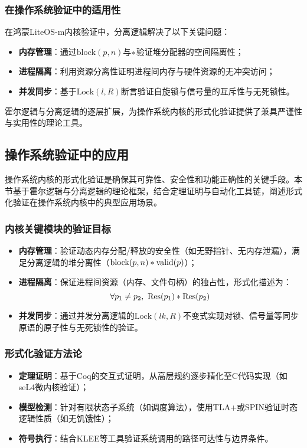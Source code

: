 \subsubsection{在操作系统验证中的适用性}
在鸿蒙LiteOS-m内核验证中，分离逻辑解决了以下关键问题：
\begin{itemize}
    \item \textbf{内存管理}：通过$\mathrm{block}(p, n)$与$\ast$验证堆分配器的空间隔离性；
    \item \textbf{进程隔离}：利用资源分离性证明进程间内存与硬件资源的无冲突访问；
    \item \textbf{并发同步}：基于$\mathrm{Lock}(l, R)$断言验证自旋锁与信号量的互斥性与无死锁性。
\end{itemize}

霍尔逻辑与分离逻辑的逐层扩展，为操作系统内核的形式化验证提供了兼具严谨性与实用性的理论工具。
\subsection{操作系统验证中的应用}
\label{subsec:os-verification}

操作系统内核的形式化验证是确保其可靠性、安全性和功能正确性的关键手段。本节基于霍尔逻辑与分离逻辑的理论框架，结合定理证明与自动化工具链，阐述形式化验证在操作系统内核中的典型应用场景。

\subsubsection{内核关键模块的验证目标}
\begin{itemize}
    \item \textbf{内存管理}：验证动态内存分配/释放的安全性（如无野指针、无内存泄漏），满足分离逻辑的堆分离性（$\mathrm{block}(p, n) \ast \mathrm{valid}(p)$）；
    \item \textbf{进程隔离}：保证进程间资源（内存、文件句柄）的独占性，形式化描述为：
        \begin{equation}
            \forall p_1 \neq p_2,\ \mathrm{Res}(p_1) \ast \mathrm{Res}(p_2)
        \end{equation}
    \item \textbf{并发同步}：通过并发分离逻辑的$\mathrm{Lock}(lk, R)$不变式实现对锁、信号量等同步原语的原子性与无死锁性的验证。
\end{itemize}

\subsubsection{形式化验证方法论}
\begin{itemize}
    \item \textbf{定理证明}：基于Coq的交互式证明，从高层规约逐步精化至C代码实现（如seL4微内核验证）；
    \item \textbf{模型检测}：针对有限状态子系统（如调度算法），使用TLA+或SPIN验证时态逻辑性质（如无饥饿性）；
    \item \textbf{符号执行}：结合KLEE等工具验证系统调用的路径可达性与边界条件。
\end{itemize}

